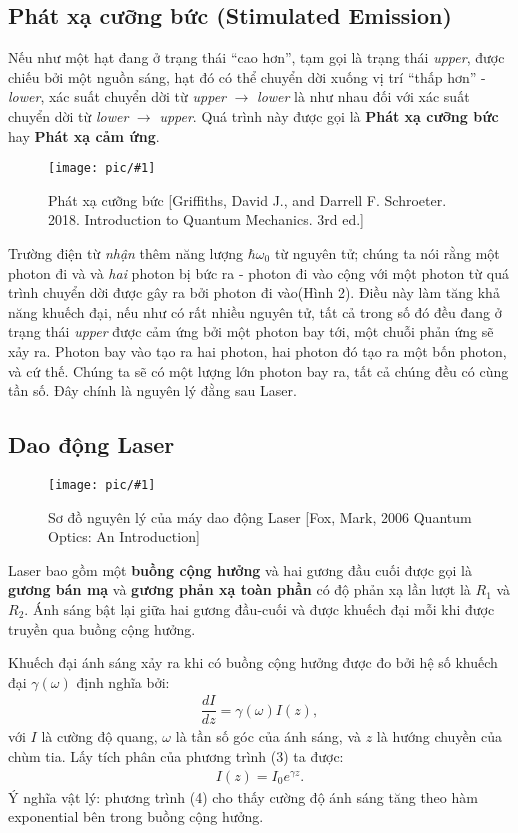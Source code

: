 \documentclass{article}
\newcommand{\image}[2]{
	\begin{figure}[h!]
		\centering
		\texttt{[image: pic/\#1]}
		\caption{#2}
	\end{figure}
}
\newcommand{\f}[2]{\dfrac{#1}{#2}}
\begin{document}
\subsection{Phát xạ cưỡng bức (Stimulated Emission)}
Nếu như một hạt đang ở trạng thái ``cao hơn'', tạm gọi là trạng thái \textit{upper}, được chiếu bởi một nguồn sáng, hạt đó có thể chuyển dời xuống vị trí ``thấp hơn'' - \textit{lower}, xác suất chuyển dời từ \textit{upper} $\rightarrow$ \textit{lower} là như nhau đối với xác suất chuyển dời từ \textit{lower} $\rightarrow$ \textit{upper}. Quá trình này được gọi là \textbf{Phát xạ cưỡng bức} hay \textbf{Phát xạ cảm ứng}.
\image{stimulatedemission.png}{Phát xạ cưỡng bức [Griffiths, David J., and Darrell F. Schroeter. 2018. Introduction to Quantum Mechanics. 3rd ed.]}

Trường điện từ \textit{nhận} thêm năng lượng $\hbar \omega_0$ từ nguyên tử; chúng ta nói rằng một photon đi và và \textit{hai} photon bị bức ra - photon đi vào cộng với một photon từ quá trình chuyển dời được gây ra bởi photon đi vào(Hình 2). Điều này làm tăng khả năng khuếch đại, nếu như có rất nhiều nguyên tử, tất cả trong số đó đều đang ở trạng thái \textit{upper} được cảm ứng bởi một photon bay tới, một chuỗi phản ứng sẽ xảy ra. Photon bay vào tạo ra hai photon, hai photon đó tạo ra một bốn photon, và cứ thế. Chúng ta sẽ có một lượng lớn photon bay ra, tất cả chúng đều có cùng tần số. Đây chính là nguyên lý đằng sau Laser.
\subsection{Dao động Laser}
\image{fig4.8.png}{Sơ đồ nguyên lý của máy dao động Laser [Fox, Mark, 2006 Quantum Optics: An Introduction]}

Laser bao gồm một \textbf{buồng cộng hưởng} và hai gương đầu cuối được gọi là \textbf{gương bán mạ} và \textbf{gương phản xạ toàn phần} có độ phản xạ lần lượt là $R_1$ và $R_2$. Ánh sáng bật lại giữa hai gương đầu-cuối và được khuếch đại mỗi khi được truyền qua buồng cộng hưởng.

Khuếch đại ánh sáng xảy ra khi có buồng cộng hưởng được đo bởi hệ số khuếch đại $\gamma(\omega)$ định nghĩa bởi:
\begin{align}
	\f{d I}{d z} = \gamma(\omega) I(z),
\end{align}
với	$I$ là cường độ quang, $\omega$ là tần số góc của ánh sáng, và $z$ là hướng chuyền của chùm tia. Lấy tích phân của phương trình (3) ta được:
\begin{align}
	I(z) = I_0 e^{\gamma z}.
\end{align}
Ý nghĩa vật lý: phương trình (4) cho thấy cường độ ánh sáng tăng theo hàm exponential bên trong buồng cộng hưởng.
\end{document}
